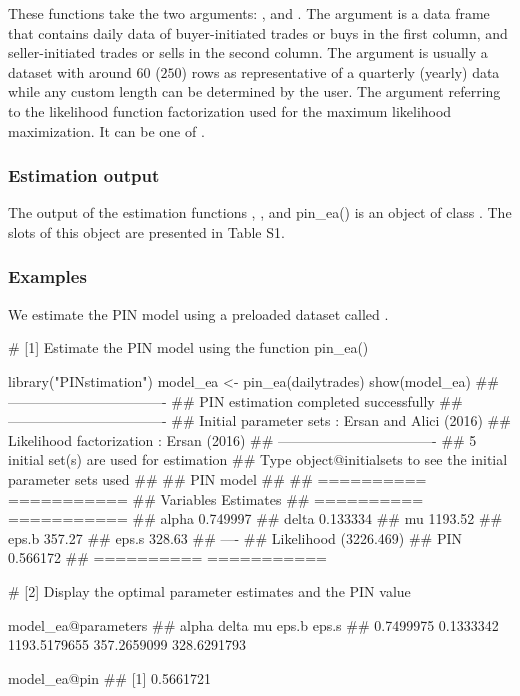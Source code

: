 These functions take the two arguments: , and . The  argument is a data frame that contains daily data of buyer-initiated trades or buys in the first column, and seller-initiated trades or sells in the second column. The argument  is usually a dataset with around $60$ ($250$) rows as representative of a quarterly (yearly) data while any custom length can be determined by the user. The  argument referring to the likelihood function factorization used for the maximum likelihood maximization. It can be one of .



\subsubsection{Estimation output}
The output of the estimation functions , ,  and {pin\_ea()} is an  object of class . The slots of this object are presented in Table S1.


\subsubsection{Examples}
We estimate the PIN model using a preloaded dataset called . 

\begin{example}
# [1] Estimate the PIN model using the function pin_ea()

library("PINstimation")
model_ea <- pin_ea(dailytrades)
show(model_ea)
## ----------------------------------
## PIN estimation completed successfully
## ----------------------------------
## Initial parameter sets   : Ersan and Alici (2016)
## Likelihood factorization : Ersan (2016)
## ----------------------------------
## 5 initial set(s) are used for estimation 
## Type object@initialsets to see the initial parameter sets used
## 
##  PIN model   
##  
## ==========  ===========
## Variables   Estimates  
## ==========  ===========
## alpha       0.749997   
## delta       0.133334   
## mu          1193.52    
## eps.b       357.27     
## eps.s       328.63     
## ----                   
## Likelihood  (3226.469) 
## PIN         0.566172   
## ==========  ===========
\end{example}

\begin{example}
# [2] Display the optimal parameter estimates and the PIN value

model_ea@parameters
##    alpha        delta           mu        eps.b        eps.s 
##   0.7499975    0.1333342 1193.5179655  357.2659099  328.6291793 

model_ea@pin
## [1] 0.5661721
\end{example}
   

